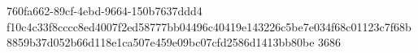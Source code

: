760fa662-89cf-4ebd-9664-150b7637ddd4
f10c4c33f8cccc8ed4007f2ed58777bb04496c40419e143226c5be7e034f68c01123c7f68b8859b37d052b66d118e1ca507e459e09bc07cfd2586d1413bb80be
3686
